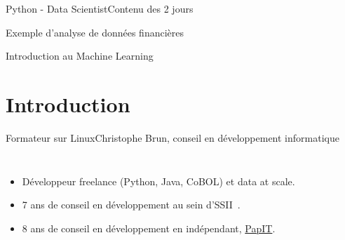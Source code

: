 \documentclass{beamer}
\begin{document}
\begin{frame}{Python - Data Scientist}{Contenu des 2 jours}
\begin{tiny}
\begin{multicols}{3}
\begin{itemize}
{                    \item Exemple d'analyse de données financières

                    \item Introduction au Machine Learning
                }
                \end{itemize}
            \end{multicols}
        \end{tiny}

    \end{frame}


    \section{Introduction}\label{sec:introduction}


    \begin{frame}{Formateur sur Linux}{Christophe Brun, conseil en développement informatique}

        \begin{columns}
            \begin{itemize}
                \item Développeur freelance (Python, Java, CoBOL) et data at scale.

                \item 7 ans de conseil en développement au sein d'SSII~.

                \item 8 ans de conseil en développement en indépendant, \href{https://papit.fr}{PapIT}.


\end{itemize}
\end{columns}
\end{frame}
\end{document}
